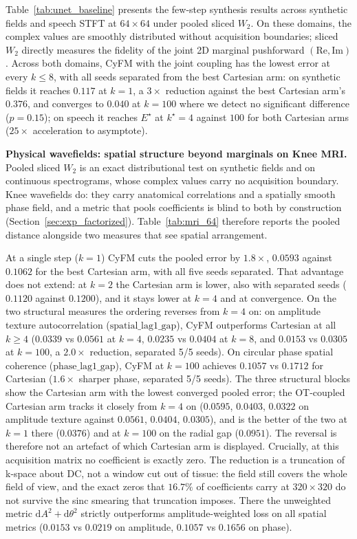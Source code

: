 Table~\ref{tab:unet_baseline} presents the few-step synthesis results across synthetic fields and speech STFT at $64\times64$ under pooled sliced $W_2$. On these domains, the complex values are smoothly distributed without acquisition boundaries; sliced $W_2$ directly measures the fidelity of the joint 2D marginal pushforward $(\mathrm{Re}, \mathrm{Im})$. Across both domains, CyFM with the joint coupling has the lowest error at every $k \le 8$, with all seeds separated from the best Cartesian arm: on synthetic fields it reaches $0.117$ at $k=1$, a $3\times$ reduction against the best Cartesian arm's $0.376$, and converges to $0.040$ at $k=100$ where we detect no significant difference ($p=0.15$); on speech it reaches $E^\star$ at $k^\star = 4$ against $100$ for both Cartesian arms ($25\times$ acceleration to asymptote).

\textbf{Physical wavefields: spatial structure beyond marginals on Knee MRI.} Pooled sliced $W_2$ is an exact distributional test on synthetic fields and on continuous spectrograms, whose complex values carry no acquisition boundary. Knee wavefields do: they carry anatomical correlations and a spatially smooth phase field, and a metric that pools coefficients is blind to both by construction (Section~\ref{sec:exp_factorized}). Table~\ref{tab:mri_64} therefore reports the pooled distance alongside two measures that see spatial arrangement.



At a single step ($k=1$) CyFM cuts the pooled error by $1.8\times$, $0.0593$ against $0.1062$ for the best Cartesian arm, with all five seeds separated. That advantage does not extend: at $k=2$ the Cartesian arm is lower, also with separated seeds ($0.1120$ against $0.1200$), and it stays lower at $k=4$ and at convergence. On the two structural measures the ordering reverses from $k=4$ on: on amplitude texture autocorrelation ($\text{spatial\_lag1\_gap}$), CyFM outperforms Cartesian at all $k \ge 4$ ($0.0339$ vs $0.0561$ at $k=4$, $0.0235$ vs $0.0404$ at $k=8$, and $0.0153$ vs $0.0305$ at $k=100$, a $2.0\times$ reduction, separated 5/5 seeds). On circular phase spatial coherence ($\text{phase\_lag1\_gap}$), CyFM at $k=100$ achieves $0.1057$ vs $0.1712$ for Cartesian ($1.6\times$ sharper phase, separated 5/5 seeds). The three structural blocks show the Cartesian arm with the lowest converged pooled error; the OT-coupled Cartesian arm tracks it closely from $k=4$ on ($0.0595$, $0.0403$, $0.0322$ on amplitude texture against $0.0561$, $0.0404$, $0.0305$), and is the better of the two at $k=1$ there ($0.0376$) and at $k=100$ on the radial gap ($0.0951$). The reversal is therefore not an artefact of which Cartesian arm is displayed. Crucially, at this acquisition matrix no coefficient is exactly zero. The reduction is a truncation of k-space about DC, not a window cut out of tissue: the field still covers the whole field of view, and the exact zeros that $16.7\%$ of coefficients carry at $320\times320$ do not survive the sinc smearing that truncation imposes. There the unweighted metric $\mathrm{d}A^2 + \mathrm{d}\theta^2$ strictly outperforms amplitude-weighted loss on all spatial metrics ($0.0153$ vs $0.0219$ on amplitude, $0.1057$ vs $0.1656$ on phase).

